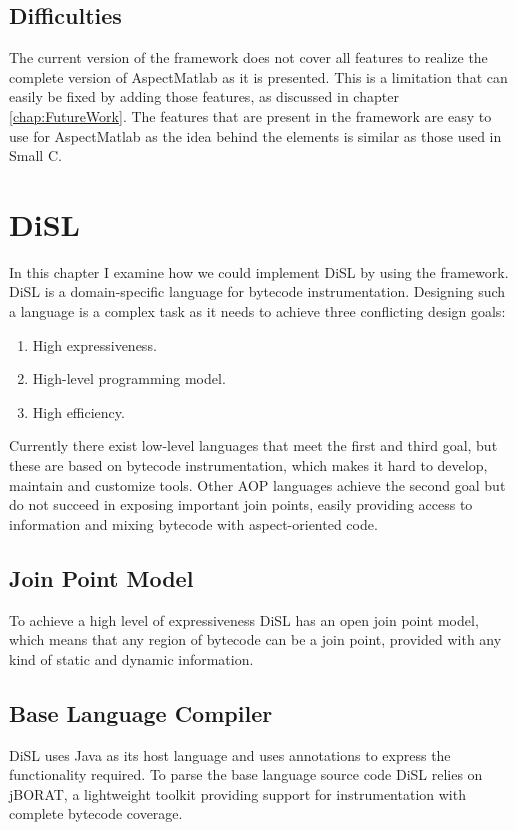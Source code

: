 \documentclass[a4paper]{report}
\begin{document}
\section{Difficulties}
The current version of the framework does not cover all features to realize the complete version of AspectMatlab as it is presented. This is a limitation that can easily be fixed by adding those features, as discussed in chapter \ref{chap:FutureWork}. The features that are present in the framework are easy to use for AspectMatlab as the idea behind the elements is similar as those used in Small C.

\chapter{DiSL}
\label{chap:DiSL}
In this chapter I examine how we could implement DiSL by using the framework. DiSL \citep{marek_disl:_2012} is a domain-specific language for bytecode instrumentation. Designing such a language is a complex task as it needs to achieve three conflicting design goals:
\begin{enumerate}
\item High expressiveness.
\item High-level programming model.
\item High efficiency.
\end{enumerate}
Currently there exist low-level languages that meet the first and third goal, but these are based on bytecode instrumentation, which makes it hard to develop, maintain and customize tools. Other AOP languages achieve the second goal but do not succeed in exposing important join points, easily providing access to information and mixing bytecode with aspect-oriented code.

\section{Join Point Model}
To achieve a high level of expressiveness DiSL has an open join point model, which means that any region of bytecode can be a join point, provided with any kind of static and dynamic information.

\section{Base Language Compiler}
DiSL uses Java as its host language and uses annotations to express the functionality required. To parse the base language source code DiSL relies on jBORAT, a lightweight toolkit providing support for instrumentation with complete bytecode coverage.
\end{document}
